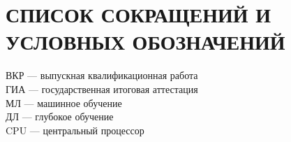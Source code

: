 \chapter*{СПИСОК СОКРАЩЕНИЙ И УСЛОВНЫХ ОБОЗНАЧЕНИЙ}
\setlength{\parindent}{0pt}
ВКР --- выпускная квалификационная работа\\[0.5em]
ГИА --- государственная итоговая аттестация\\[0.5em]
МЛ --- машинное обучение\\[0.5em]
ДЛ --- глубокое обучение\\[0.5em]
CPU --- центральный процессор